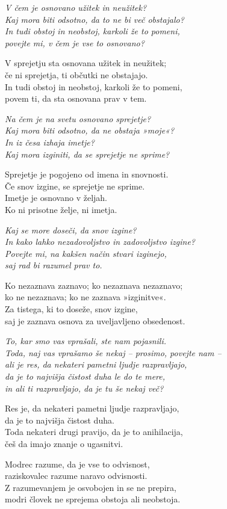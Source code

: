 \emph{V čem je osnovano užitek in neužitek?}\\
\emph{Kaj mora biti odsotno, da to ne bi več obstajalo?}\\
\emph{In tudi obstoj in neobstoj, karkoli že to pomeni,}\\
\emph{povejte mi, v čem je vse to osnovano?}

V sprejetju sta osnovana užitek in neužitek;\\
če ni sprejetja, ti občutki ne obstajajo.\\
In tudi obstoj in neobstoj, karkoli že to pomeni,\\
povem ti, da sta osnovana prav v tem.

\emph{Na čem je na svetu osnovano sprejetje?\\
Kaj mora biti odsotno, da ne obstaja »moje«?}\\
\emph{In iz česa izhaja imetje?}\\
\emph{Kaj mora izginiti, da se sprejetje ne sprime?}

Sprejetje je pogojeno od imena in snovnosti.\\
Če snov izgine, se sprejetje ne sprime.\\
Imetje je osnovano v željah.\\
Ko ni prisotne želje, ni imetja.

\emph{Kaj se more doseči, da snov izgine?}\\
\emph{In kako lahko nezadovoljstvo in zadovoljstvo izgine?}\\
\emph{Povejte mi, na kakšen način stvari izginejo,}\\
\emph{saj rad bi razumel prav to.}

Ko nezaznava zaznavo; ko nezaznava nezaznavo;\\
ko ne nezaznava; ko ne zaznava »izginitve«.\\
Za tistega, ki to doseže, snov izgine,\\
saj je zaznava osnova za uveljavljeno obsedenost.

\emph{To, kar smo vas vprašali, ste nam pojasnili.}\\
\emph{Toda, naj vas vprašamo še nekaj -- prosimo, povejte nam --}\\
\emph{ali je res, da nekateri pametni ljudje razpravljajo,}\\
\emph{da je to najvišja čistost duha le do te mere,}\\
\emph{in ali ti razpravljajo, da je tu še nekaj več?}

Res je, da nekateri pametni ljudje razpravljajo,\\
da je to najvišja čistost duha.\\
Toda nekateri drugi pravijo, da je to anihilacija,\\
češ da imajo znanje o ugasnitvi.

Modrec razume, da je vse to odvisnost,\\
raziskovalec razume naravo odvisnosti.\\
Z razumevanjem je osvobojen in se ne prepira,\\
modri človek ne sprejema obstoja ali neobstoja.

